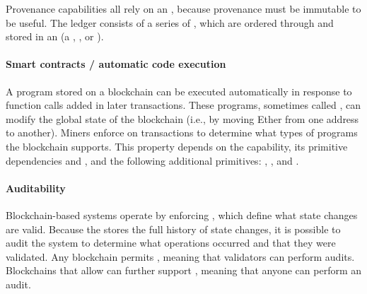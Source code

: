 Provenance capabilities all rely on an , because provenance must be immutable to be useful. The ledger consists of a series of , which are ordered through  and stored in an  (a , , or ). 

\paragraph{Smart contracts / automatic code execution} A program stored on a blockchain can be executed automatically in response to function calls added in later transactions. These programs, sometimes called , can modify the global state of the blockchain (i.e., by moving Ether from one address to another). Miners enforce  on transactions to determine what types of programs the blockchain supports. This property depends on the  capability, its primitive dependencies  and , and the following additional primitives: , , and .

\paragraph{Auditability} Blockchain-based systems operate by enforcing , which define what state changes are valid. Because the  stores the full history of state changes, it is possible to audit the system to determine what operations occurred and that they were validated. Any blockchain permits , meaning that validators can perform audits. Blockchains that allow  can further support , meaning that anyone can perform an audit.

